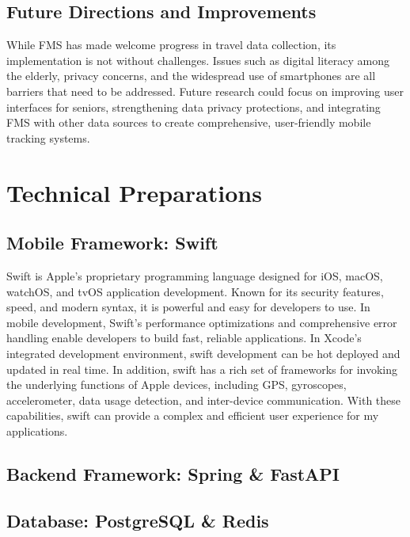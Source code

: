 \documentclass[12pt,two side]{report}
\begin{document}
\section{Future Directions and Improvements}
While FMS has made welcome progress in travel data collection, its implementation is not without challenges. Issues such as digital literacy among the elderly, privacy concerns, and the widespread use of smartphones are all barriers that need to be addressed. Future research could focus on improving user interfaces for seniors, strengthening data privacy protections, and integrating FMS with other data sources to create comprehensive, user-friendly mobile tracking systems.

\chapter{Technical Preparations}
\section{Mobile Framework: Swift}

Swift is Apple's proprietary programming language designed for iOS, macOS, watchOS, and tvOS application development. Known for its security features, speed, and modern syntax, it is powerful and easy for developers to use. In mobile development, Swift's performance optimizations and comprehensive error handling enable developers to build fast, reliable applications. In Xcode's integrated development environment, swift development can be hot deployed and updated in real time. In addition, swift has a rich set of frameworks for invoking the underlying functions of Apple devices, including GPS, gyroscopes, accelerometer, data usage detection, and inter-device communication. With these capabilities, swift can provide a complex and efficient user experience for my applications.

\section{Backend Framework: Spring \& FastAPI}
\section{Database: PostgreSQL \& Redis}
\end{document}
